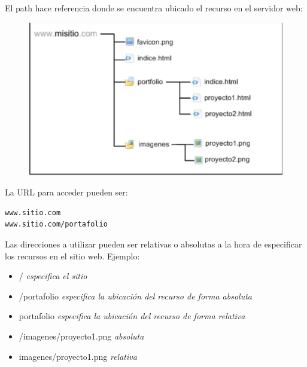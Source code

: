 \documentclass[4paper]{article}
\begin{document}
El path hace referencia donde se encuentra ubicado el recurso en el servidor web:
\begin{figure}[H]
\includegraphics[scale=1]{../imagenes/sitioweb.png}
\end{figure}
La URL para acceder pueden ser:
\begin{verbatim}
www.sitio.com
www.sitio.com/portafolio
\end{verbatim}
Las direcciones a utilizar pueden ser relativas o absolutas a la hora de especificar los recursos en el sitio web. Ejemplo:
\begin{itemize}
\item / \emph{especifica el sitio}
\item /portafolio \emph{especifica la ubicación del recurso de forma absoluta}
\item portafolio \emph{especifica la ubicación del recurso de forma relativa}
\item /imagenes/proyecto1.png \emph{absoluta}
\item imagenes/proyecto1.png \emph{relativa}
\end{itemize}

\end{document}
